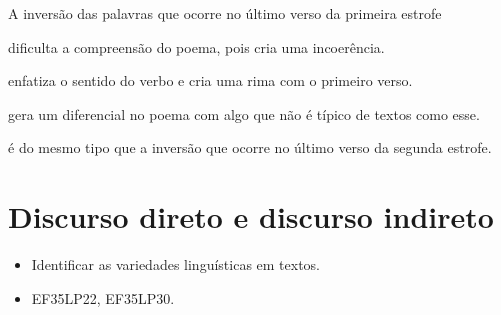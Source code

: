 A inversão das palavras que ocorre no último verso da primeira estrofe

\begin{escolha}
\item dificulta a compreensão do poema, pois cria uma incoerência.

\item enfatiza o sentido do verbo e cria uma rima com o primeiro verso.

\item gera um diferencial no poema com algo que não é típico de textos como esse.

\item é do mesmo tipo que a inversão que ocorre no último verso da segunda estrofe.
\end{escolha}

\chapter{Discurso direto e discurso indireto}


\begin{itemize}
  \item Identificar as variedades linguísticas em textos.
\end{itemize}


\begin{itemize}
  \item EF35LP22, EF35LP30.
\end{itemize}

